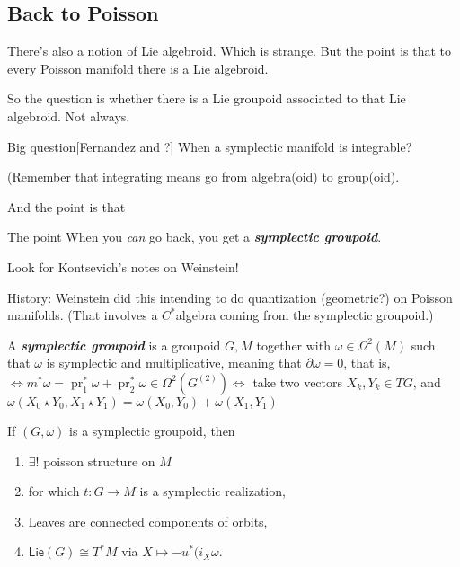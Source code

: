 \subsection{Back to Poisson}

There's also a notion of Lie algebroid. Which is strange. But the point is that to every Poisson manifold there is a Lie algebroid.

So the question is whether there is a Lie groupoid associated to that Lie algebroid. Not always.

\begin{thing6}{Big question}[Fernandez and ?]\leavevmode
When a symplectic manifold is integrable?
\end{thing6}

(Remember that integrating means go from algebra(oid) to group(oid).

And the point is that
\begin{thing7}{The point}\leavevmode
When you \textit{can} go back, you get a \textit{\textbf{symplectic groupoid}}. 
\end{thing7}

\begin{remark}\leavevmode
Look for Kontsevich's notes on Weinstein!
\end{remark}

\begin{remark}\leavevmode
History: Weinstein did this intending to do quantization (geometric?) on Poisson manifolds. (That involves a \(C^*\)algebra coming from the symplectic groupoid.)
\end{remark}

\begin{defn}\leavevmode
A \textit{\textbf{symplectic groupoid}} is a groupoid \(G, M\) together with  \(\omega \in \Omega^2(M)\) such that \(\omega\) is symplectic and multiplicative, meaning that \(\partial  \omega =0\), that is, \(\iff m^*\omega=\operatorname{pr}_1^*\omega+\operatorname{pr}^*_2\omega\in \Omega^{2}(G^{(2)})\iff\) take two vectors \( X_k,Y_k \in TG\), and \(\omega(X_0 \star Y_0,X_1\star Y_1) =  \omega(X_0,Y_0) + \omega (X_1,Y_1)\)
\end{defn}

\begin{thm}\leavevmode
If \((G, \omega)\) is a symplectic groupoid, then
\begin{enumerate}
\item \(\exists !\) poisson structure on \(M\) 
\item for which \(t: G \to M\) is a symplectic realization,
\item  Leaves are connected components of orbits,
\item \(\mathsf{Lie}(G)\cong T^*M\) via \(X \mapsto -u ^*(i_X \omega\).
\end{enumerate}
\end{thm}

